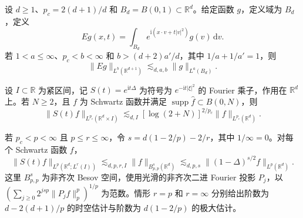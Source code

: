 设 $d\geq 1$、$p_c=2(d+1)/d$ 和 $B_d=B(0,1)\subset\mathbb R^d$。给定函数 $g$，定义域为 $B_d$，定义
\[
Eg(x,t)=\int_{B_d}e^{\mathrm i(x\cdot v+t|v|^2)}g(v)\,\mathrm dv.
\]
若 $1<a\leq\infty$、$p_c<b<\infty$ 和 $b>(d+2)a'/d$，其中 $1/a+1/a'=1$，则
\[
\|Eg\|_{L^b(\mathbb R^{d+1})}\lesssim_{d,a,b}\|g\|_{L^a(B_d)}.
\]

设 $I\subset\mathbb R$ 为紧区间，记 $S(t)=e^{\mathrm i t\Delta}$ 为符号为 $e^{-\mathrm i t|\xi|^2}$ 的 Fourier 乘子，作用在 $\mathbb R^d$ 上。若 $N\geq 2$，且 $f$ 为 Schwartz 函数并满足 $\operatorname{supp}\widehat f\subset B(0,N)$，则
\[
\|S(t)f\|_{L^{p_c}(\mathbb R^d\times I)}
 \lesssim_{d,I}[\log(2+N)]^{2/p_c}\|f\|_{L^{p_c}(\mathbb R^d)}.
\]

若 $p_c<p<\infty$ 且 $p\leq r\leq\infty$，令 $s=d(1-2/p)-2/r$，其中 $1/\infty=0$。对每个 Schwartz 函数 $f$，
\[
\|S(t)f\|_{L^p(\mathbb R^d;L^r(I))}
 \lesssim_{d,p,r,I}\|f\|_{B^s_{p,p}(\mathbb R^d)}
 \lesssim_{d,p,s}\|(1-\Delta)^{s/2}f\|_{L^p(\mathbb R^d)}.
\]
这里 $B^s_{p,p}$ 为非齐次 Besov 空间，使用光滑的非齐次二进 Fourier 投影 $P_j$，以 $(\sum_{j\geq 0}2^{jsp}\|P_jf\|_p^p)^{1/p}$ 为范数。情形 $r=p$ 和 $r=\infty$ 分别给出阶数为 $d-2(d+1)/p$ 的时空估计与阶数为 $d(1-2/p)$ 的极大估计。
